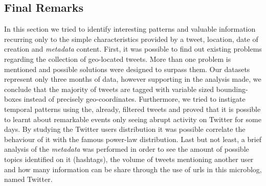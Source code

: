 \begin{table}[htbp]
	\centering
	\caption{Percentage of Metadata composing the datasets}
	\label{tab:metadata}
\end{table}

\subsection{Final Remarks}
In this section we tried to identify interesting patterns and valuable information recurring only to the simple characteristics provided by a tweet, location, date of creation and \textit{metadata} content. First, it was possible to find out existing problems regarding the collection of geo-located tweets. More than one problem is mentioned and possible solutions were designed to surpass them. Our datasets represent only three months of data, however supporting in the analysis made, we conclude that the majority of tweets are tagged with variable sized bounding-boxes instead of precisely geo-coordinates. Furthermore, we tried to instigate temporal patterns using the, already, filtered tweets and proved that it is possible to learnt about remarkable events only seeing abrupt activity on Twitter for some days. By studying the Twitter users distribution it was possible correlate the behaviour of it with the famous power-law distribution. Last but not least, a brief analysis of the \textit{metadata} was performed in order to see the amount of possible topics identified on it (hashtags), the volume of tweets mentioning another user and how many information can be share through the use of urls in this microblog, named Twitter.

